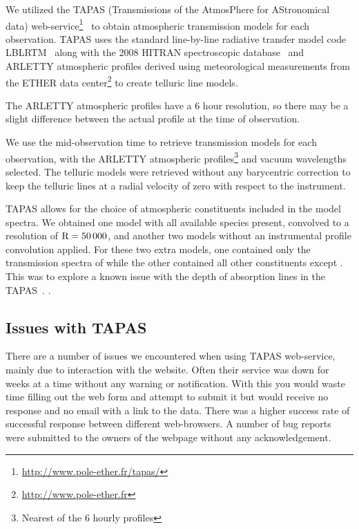 We utilized the {TAPAS} (Transmissions of the {AtmosPhere} for {AStronomical} data) web-service\footnote{\url{http://www.pole-ether.fr/tapas/}}~\citep{bertaux_tapas_2014} to obtain atmospheric transmission models for each observation. {TAPAS} uses the standard line-by-line radiative transfer model code {LBLRTM}~\citep{clough_linebyline_1995} along with the 2008 {HITRAN} spectroscopic database~\citep{rothman_hitran_2009} and {ARLETTY} atmospheric profiles derived using meteorological measurements from the {ETHER} data center\footnote{\url{http://www.pole-ether.fr}} to create telluric line models.

The {ARLETTY} atmospheric profiles have a 6 hour resolution, so there may be a slight difference between the actual profile at the time of observation.

We use the mid-observation time to retrieve transmission models for each observation, with the {ARLETTY} atmospheric profiles\footnote{Nearest of the 6 hourly profiles} and vacuum wavelengths selected. The telluric models were retrieved without any barycentric correction to keep the telluric lines at a radial velocity of zero with respect to the instrument.

{TAPAS} allows for the choice of atmospheric constituents included in the model spectra. We obtained one model with all available species present, convolved to a resolution of \(\rm R=50\,000\), and another two models without an instrumental profile convolution applied. For these two extra models, one contained only the transmission spectra of while the other contained all other constituents except . This was to explore a known issue with the depth of absorption lines in the {TAPAS}~\citet{bertaux_tapas_2014}. .


\subsection{Issues with {TAPAS}}
There are a number of issues we encountered when using {TAPAS} web-service, mainly due to interaction with the website. Often their service was down for weeks at a time without any warning or notification. With this you would waste time filling out the web form and attempt to submit it but would receive no response and no email with a link to the data. There was a higher success rate of successful response between different web-browsers. A number of bug reports were submitted to the owners of the webpage without any acknowledgement.

